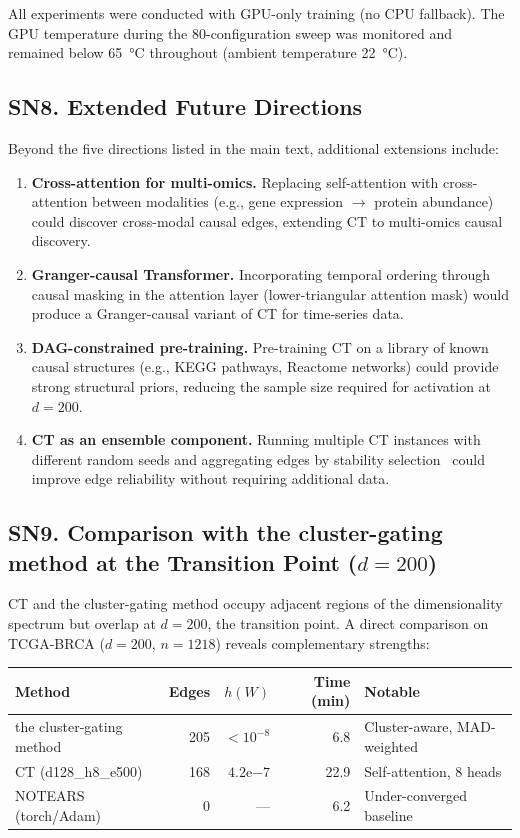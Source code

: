 \documentclass[12pt,a4paper]{article}
\begin{document}
All experiments were conducted with GPU-only training (no CPU fallback). The GPU temperature during the 80-configuration sweep was monitored and remained below 65~°C throughout (ambient temperature 22~°C).

\subsection*{SN8. Extended Future Directions}

Beyond the five directions listed in the main text, additional extensions include:

\begin{enumerate}[leftmargin=*,itemsep=2pt]
    \item \textbf{Cross-attention for multi-omics.} Replacing self-attention with cross-attention between modalities (e.g., gene expression $\to$ protein abundance) could discover cross-modal causal edges, extending CT to multi-omics causal discovery.
    \item \textbf{Granger-causal Transformer.} Incorporating temporal ordering through causal masking in the attention layer (lower-triangular attention mask) would produce a Granger-causal variant of CT for time-series data.
    \item \textbf{DAG-constrained pre-training.} Pre-training CT on a library of known causal structures (e.g., KEGG pathways, Reactome networks) could provide strong structural priors, reducing the sample size required for activation at $d=200$.
    \item \textbf{CT as an ensemble component.} Running multiple CT instances with different random seeds and aggregating edges by stability selection~\cite{meinshausen2010stability} could improve edge reliability without requiring additional data.
\end{enumerate}

\subsection*{SN9. Comparison with the cluster-gating method at the Transition Point ($d=200$)}

CT and the cluster-gating method occupy adjacent regions of the dimensionality spectrum but overlap at $d=200$, the transition point. A direct comparison on TCGA-BRCA ($d=200$, $n=1218$) reveals complementary strengths:

\begin{center}
\begin{tabular}{lrrrl}
\toprule
Method & Edges & $h(W)$ & Time (min) & Notable \\
\midrule
the cluster-gating method & 205 & $<10^{-8}$ & 6.8 & Cluster-aware, MAD-weighted \\
CT (d128\_h8\_e500) & 168 & $4.2$e$-7$ & 22.9 & Self-attention, 8 heads \\
NOTEARS (torch/Adam) & 0 & --- & 6.2 & Under-converged baseline \\
\bottomrule
\end{tabular}
\end{center}
\end{document}
